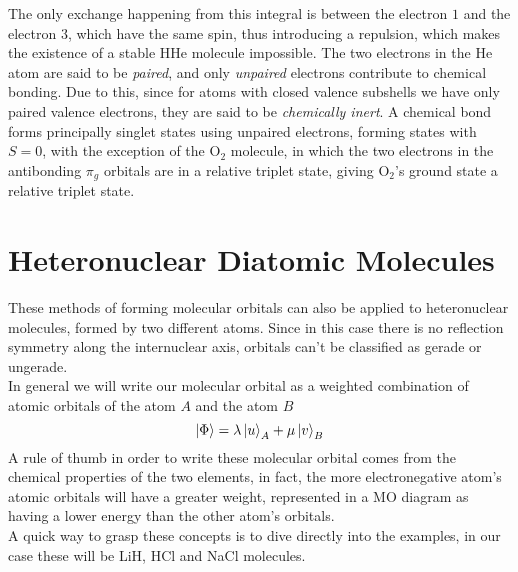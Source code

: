 \documentclass[../qm.tex]{subfiles}
\begin{document}
	The only exchange happening from this integral is between the electron $1$ and the electron $3$, which have the same spin, thus introducing a repulsion, which makes the existence of a stable $\mathrm{HHe}$ molecule impossible. The two electrons in the He atom are said to be \textit{paired}, and only \textit{unpaired} electrons contribute to chemical bonding. Due to this, since for atoms with closed valence subshells we have only paired valence electrons, they are said to be \textit{chemically inert}. A chemical bond forms principally singlet states using unpaired electrons, forming states with $S=0$, with the exception of the  $\mathrm{O}_2$ molecule, in which the two electrons in the antibonding $\pi_g$ orbitals are in a relative triplet state, giving $\mathrm{O}_2$'s ground state a relative triplet state.
	\section{Heteronuclear Diatomic Molecules}
	These methods of forming molecular orbitals can also be applied to heteronuclear molecules, formed by two different atoms. Since in this case there is no reflection symmetry along the internuclear axis, orbitals can't be classified as gerade or ungerade.\\
	In general we will write our molecular orbital as a weighted combination of atomic orbitals of the atom $A$ and the atom $B$
	\begin{equation}
		\ket{\Phi}=\lambda\ket{u}_A+\mu\ket{v}_B
		\label{eq:heteromolorb}
	\end{equation}
	A rule of thumb in order to write these molecular orbital comes from the chemical properties of the two elements, in fact, the more electronegative atom's atomic orbitals will have a greater weight, represented in a MO diagram as having a lower energy than the other atom's orbitals.\\
	A quick way to grasp these concepts is to dive directly into the examples, in our case these will be LiH, HCl and NaCl molecules.
\end{document}
